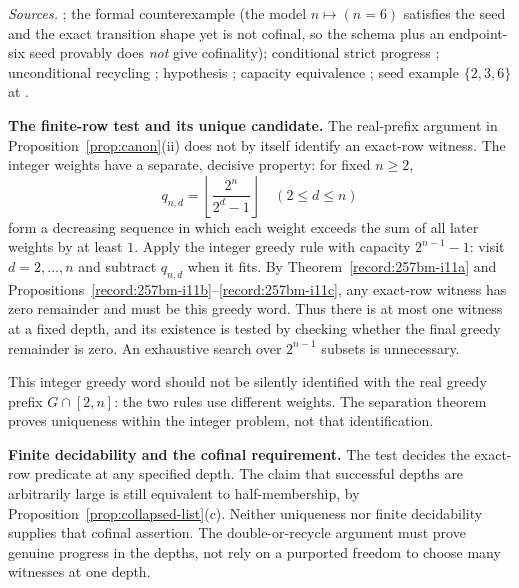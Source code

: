 \textit{Sources.} ;
the formal counterexample
(the model $n \mapsto (n = 6)$ satisfies the seed and the exact transition shape yet is not
cofinal, so the schema plus an endpoint-six seed provably does \emph{not} give cofinality);
conditional strict progress
;
unconditional recycling
;
hypothesis ;
capacity equivalence
;
seed example $\{2,3,6\}$ at
.

\textbf{The finite-row test and its unique candidate.}
The real-prefix argument in Proposition~\ref{prop:canon}(ii) does not
by itself identify an exact-row witness.  The integer weights have a
separate, decisive property: for fixed $n\ge2$,
\[
 q_{n,d}=\left\lfloor\frac{2^n}{2^d-1}\right\rfloor
 \quad(2\le d\le n)
\]
form a decreasing sequence in which each weight exceeds the sum of all
later weights by at least $1$.  Apply the integer greedy rule with
capacity $2^{n-1}-1$: visit $d=2,\ldots,n$ and subtract $q_{n,d}$ when
it fits.  By Theorem~\ref{record:257bm-i11a} and Propositions~\ref{record:257bm-i11b}--\ref{record:257bm-i11c},
any exact-row witness has zero remainder and must be this greedy word.
Thus there is at most one witness at a fixed depth, and its existence is
tested by checking whether the final greedy remainder is zero.
An exhaustive search over $2^{n-1}$ subsets is unnecessary.

This integer greedy word should not be silently identified with the
real greedy prefix $G\cap[2,n]$: the two rules use different weights.
The separation theorem proves uniqueness within the integer problem,
not that identification.

\textbf{Finite decidability and the cofinal requirement.}
The test decides the exact-row predicate at any specified depth.  The
claim that successful depths are arbitrarily large is still equivalent
to half-membership, by Proposition~\ref{prop:collapsed-list}(c).
Neither uniqueness nor finite decidability supplies that cofinal
assertion.  The double-or-recycle argument must prove genuine progress
in the depths, not rely on a purported freedom to choose many witnesses
at one depth.


